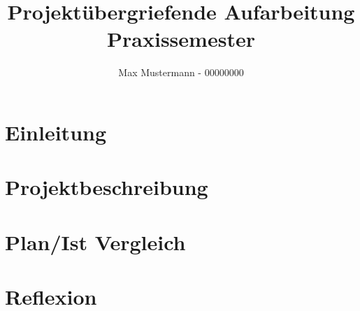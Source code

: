\documentclass[runningheads]{llncs}
\begin{document}
%
\title{Projekt\"ubergriefende Aufarbeitung Praxissemester}
%
%
\author{Max Mustermann - 00000000}
%
%
%
\maketitle              %

%
\section{Einleitung}

%
%

\newpage
\section{Projektbeschreibung}


\newpage
\section{Plan/Ist Vergleich}



\newpage
\section{Reflexion}
\end{document}
